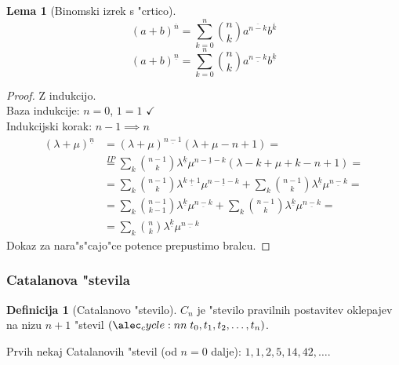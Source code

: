 \documentclass[a4paper,12pt]{article}
\theoremstyle{definition}
\newtheorem{defn}[counter]{Definicija}
\newtheorem{lemma}[counter]{Lema}
\theoremstyle{remark}
\begin{document}
\begin{lemma}[Binomski izrek s "crtico]
	\[(a+b)^{\overline{n}} = \sum_{k=0}^n \binom{n}{k}a^{\overline{n-k}} b^{\overline{k}}\]
	\[(a+b)^{\underline{n}} = \sum_{k=0}^n \binom{n}{k}a^{\underline{n-k}} b^{\underline{k}}\]
\end{lemma}
\begin{proof}
    Z indukcijo.\\
    Baza indukcije: $n = 0$, $1 = 1$ $\checkmark$\\
    Indukcijski korak: $n - 1 \implies n$
    \begin{align*}
        (\lambda + \mu)^{\underline{n}} & = (\lambda + \mu)^{\underline{n - 1}}(\lambda + \mu - n + 1) =\\
        & \overset{IP}{=} \sum_k \binom{n - 1}{k} \lambda^{\underline{k}} \mu^{\underline{n - 1 - k}} (\lambda - k + \mu + k - n + 1) = \\
        & = \sum_k \binom{n - 1}{k} \lambda^{\underline{k + 1}} \mu^{\underline{n - 1 - k}} + \sum_k \binom{n - 1}{k} \lambda^{\underline{k}} \mu^{\underline{n - k}} =\\
        & = \sum_k \binom{n - 1}{k - 1} \lambda^{\underline{k}} \mu^{\underline{n - k}} + \sum_k \binom{n - 1}{k} \lambda^{\underline{k}} \mu^{\underline{n - k}} = \\
        & = \sum_k \binom{n}{k} \lambda^{\underline{k}} \mu^{\underline{n - k}}
    \end{align*}
	Dokaz za nara"s"cajo"ce potence prepustimo bralcu.
\end{proof}

\label{TODO: tega ni blo lani in ne razumm, tkoda se ne bom s tem ukvarju}



\label{TODO: again, kaj je to? (commented out)}

\subsubsection{Catalanova "stevila}
\begin{defn}[Catalanovo "stevilo]
	$C_n$ je "stevilo pravilnih postavitev oklepajev na nizu $n+1$ "stevil $\cycle{t_0, t_1, t_2, \ldots, t_n}$.

	Prvih nekaj Catalanovih "stevil (od $n=0$ dalje): $1, 1, 2, 5, 14, 42, \ldots$.
\end{defn}
\end{document}
